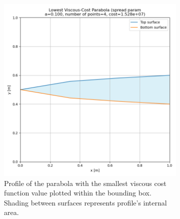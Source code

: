 \documentclass[11pt]{article}
\begin{document}
\begin{figure}[H]
\begin{subfigure}[b]{0.45\textwidth}
    \includegraphics[width=\linewidth]{../results/viscous/lowest_cost_parabola.png}
    \caption{Profile of the parabola with the smallest viscous cost function value plotted within the bounding box. Shading between surfaces represents profile's internal area.}
    \label{fig:vis-parabola-b}
\end{subfigure}
\caption{}
\label{fig:vis-parabola}
\end{figure}
\end{document}
